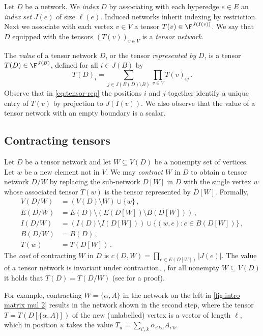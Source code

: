 Let $D$ be a network.
We \emph{index} $D$ by associating with each hyperedge $e \in E$ an \emph{index set} $J(e)$ of size $\ell(e)$.  Induced networks inherit indexing by restriction.
Next we associate with each vertex $v\in V$ a tensor
$T(v)\in\F^{J(I(v))}$. We say that $D$ equipped with the tensors
$(T(v))_{v \in V}$ is a \emph{tensor network}.

The \emph{value} of a tensor network $D$, or the tensor \emph{represented by} $D$, is a tensor $T(D) \in \F^{J(B)}$, defined for all $i \in J(B)$ by
\begin{equation}
\label{eq:tensor-rep}
T(D)_i=
\sum_{j\in J(E(D)\setminus B)}
\prod_{v\in V}T(v)_{ij}\,.
\end{equation}
Observe that in \eqref{eq:tensor-rep}
the positions $i$ and $j$ together identify a unique entry of $T(v)$
by projection to $J(I(v))$.
We also observe that the value of a tensor network with an empty boundary is a scalar.

\subsection{Contracting tensors}

Let $D$ be a tensor network and let $W\subseteq V(D)$ be a nonempty set
of vertices. Let $w$ be a new element not in $V$.
We may \emph{contract} $W$ in $D$ to obtain a tensor network $D/W$ by replacing the sub-network $D[W]$ in $D$ with the single vertex $w$ whose associated tensor $T(w)$ is the tensor represented by $D[W]$.  Formally,
\begin{equation}
\label{eq:contraction}
\begin{aligned}
V(D/W)&=(V(D)\setminus W)\cup\{w\}\,,\\
E(D/W)&=E(D)\setminus\left(E(D[W])\setminus B(D[W])\right)\,,\\
I(D/W)&=\left(I(D)\setminus I(D[W])\right)\cup\{(w,e):e\in B(D[W])\}\,,\\
B(D/W)&=B(D)\,,\\
T(w)&=T(D[W])\,.
\end{aligned}
\end{equation}
The \emph{cost} of contracting $W$ in $D$ is
$c(D,W)=\prod_{e\in E(D[W])}|J(e)|$.
The value of a tensor network is invariant under contraction, \ie,
for all nonempty $W\subseteq V(D)$ it holds that $T(D)=T(D/W)$ (see
 for a proof).

For example, contracting $W = \{\alpha, A\}$ in the network on the
left in \eqref{fig:intro matrix mul 2} results in the network shown in
the second step, where the tensor $T = T(D[\{\alpha, A\}])$ of the new (unlabelled) vertex
is a vector of length $\ell$, which in position $u$ takes the value
$T_u = \sum_{i', k} \alpha_{i'ku} A_{i'k}$.


